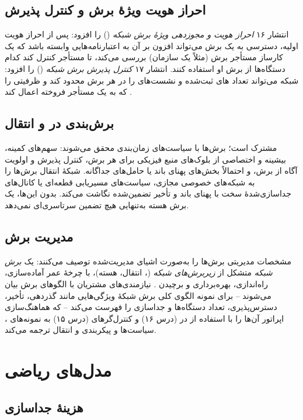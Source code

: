 \documentclass[11pt,a4paper]{article}
\begin{document}
\subsection{احراز هویت ویژهٔ برش و کنترل پذیرش}
انتشار ۱۶ \emph{احراز هویت و مجوزدهی ویژهٔ برش شبکه} () را افزود: پس از احراز هویت اولیه، دسترسی به یک برش می‌تواند
افزون بر آن به اعتبارنامه‌هایی وابسته باشد که یک کارساز  مستأجر برش (مثلاً یک سازمان) بررسی می‌کند، تا مستأجر کنترل کند
کدام دستگاه‌ها از برش او استفاده کنند. انتشار ۱۷ \emph{کنترل پذیرش برش شبکه} () را افزود: شبکه می‌تواند تعداد
های ثبت‌شده و نشست‌های  را در هر برش محدود کند و ظرفیتی را که به یک مستأجر فروخته اعمال کند \cite{ts23501}.

\subsection{برش‌بندی در  و انتقال}
 مشترک است؛ برش‌ها با سیاست‌های زمان‌بندی محقق می‌شوند: سهم‌های کمینه، بیشینه و اختصاصی از بلوک‌های منبع فیزیکی برای هر برش،
کنترل پذیرش و اولویت آگاه از برش، و احتمالاً بخش‌های پهنای باند یا حامل‌های جداگانه. شبکهٔ انتقال برش‌ها را به شبکه‌های خصوصی
مجازی، سیاست‌های مسیریابی قطعه‌ای یا کانال‌های جداسازی‌شدهٔ سخت با پهنای باند و تأخیر تضمین‌شده نگاشت می‌کند. بدون این‌ها، یک برش
هسته به‌تنهایی هیچ تضمین سرتاسری‌ای نمی‌دهد.

\subsection{مدیریت برش}
مشخصات مدیریتی  برش‌ها را به‌صورت اشیای مدیریت‌شده توصیف می‌کنند: یک \emph{برش شبکه} متشکل از \emph{زیربرش‌های شبکه}
(، انتقال، هسته)، با چرخهٔ عمر آماده‌سازی، راه‌اندازی، بهره‌برداری و برچیدن \cite{ts28530}. نیازمندی‌های مشتریان با الگوهای
برش بیان می‌شوند -- برای نمونه الگوی کلی برش شبکهٔ  ویژگی‌هایی مانند گذردهی، تأخیر، دسترس‌پذیری، تعداد دستگاه‌ها و
جداسازی را فهرست می‌کند -- که هماهنگ‌سازی اپراتور آن‌ها را با استفاده از  در  (درس ۱۶) و کنترل‌گرهای 
(درس ۱۵) به نمونه‌های ، سیاست‌ها و پیکربندی  و انتقال ترجمه می‌کند.

\section{مدل‌های ریاضی}

\subsection{هزینهٔ جداسازی}\label{sec:mux}
\end{document}

